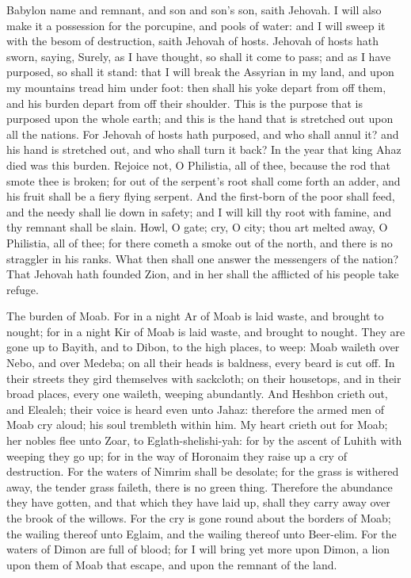 Babylon name and remnant, and son and son’s son, saith Jehovah. I will also make it a possession for the porcupine, and pools of water: and I will sweep it with the besom of destruction, saith Jehovah of hosts.  Jehovah of hosts hath sworn, saying, Surely, as I have thought, so shall it come to pass; and as I have purposed, so shall it stand: that I will break the Assyrian in my land, and upon my mountains tread him under foot: then shall his yoke depart from off them, and his burden depart from off their shoulder. This is the purpose that is purposed upon the whole earth; and this is the hand that is stretched out upon all the nations. For Jehovah of hosts hath purposed, and who shall annul it? and his hand is stretched out, and who shall turn it back?  In the year that king Ahaz died was this burden.  Rejoice not, O Philistia, all of thee, because the rod that smote thee is broken; for out of the serpent’s root shall come forth an adder, and his fruit shall be a fiery flying serpent. And the first-born of the poor shall feed, and the needy shall lie down in safety; and I will kill thy root with famine, and thy remnant shall be slain. Howl, O gate; cry, O city; thou art melted away, O Philistia, all of thee; for there cometh a smoke out of the north, and there is no straggler in his ranks.  What then shall one answer the messengers of the nation? That Jehovah hath founded Zion, and in her shall the afflicted of his people take refuge. 

The burden of Moab. For in a night Ar of Moab is laid waste, and brought to nought; for in a night Kir of Moab is laid waste, and brought to nought. They are gone up to Bayith, and to Dibon, to the high places, to weep: Moab waileth over Nebo, and over Medeba; on all their heads is baldness, every beard is cut off. In their streets they gird themselves with sackcloth; on their housetops, and in their broad places, every one waileth, weeping abundantly. And Heshbon crieth out, and Elealeh; their voice is heard even unto Jahaz: therefore the armed men of Moab cry aloud; his soul trembleth within him. My heart crieth out for Moab; her nobles flee unto Zoar, to Eglath-shelishi-yah: for by the ascent of Luhith with weeping they go up; for in the way of Horonaim they raise up a cry of destruction. For the waters of Nimrim shall be desolate; for the grass is withered away, the tender grass faileth, there is no green thing. Therefore the abundance they have gotten, and that which they have laid up, shall they carry away over the brook of the willows. For the cry is gone round about the borders of Moab; the wailing thereof unto Eglaim, and the wailing thereof unto Beer-elim. For the waters of Dimon are full of blood; for I will bring yet more upon Dimon, a lion upon them of Moab that escape, and upon the remnant of the land. 

